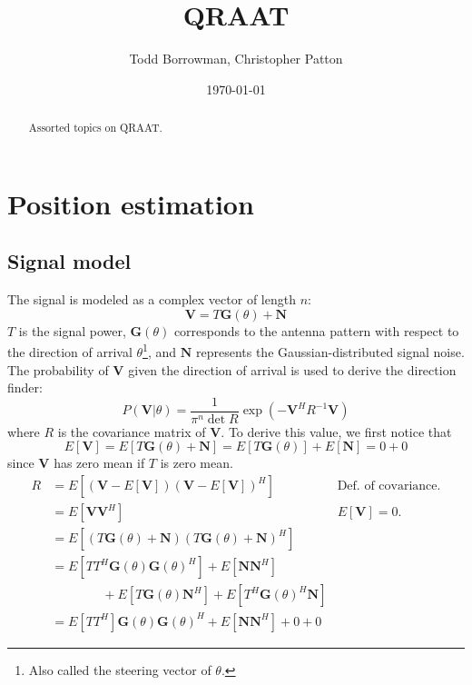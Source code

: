 \documentclass[letter]{article}
\author{Todd Borrowman, Christopher Patton}
\date{\today}
\title{QRAAT}
\newcounter{foot}
\begin{document}
\maketitle

\begin{abstract}
Assorted topics on QRAAT. 
\end{abstract}

\tableofcontents
\pagebreak



\section{Position estimation} 

  \subsection{Signal model}
The signal is modeled as a complex vector of length $n$: 
\begin{equation}
  \mathbf{V} = T\mathbf{G}(\theta) + \mathbf{N}
\end{equation}
$T$ is the signal power, $\mathbf{G}(\theta)$ corresponds to the antenna pattern 
with respect to the direction of arrival $\theta$\footnote{Also called the steering 
vector of $\theta$.}, and $\mathbf{N}$ represents 
the Gaussian-distributed signal noise. The probability of $\mathbf{V}$ given the
direction of arrival is used to derive the direction finder:
\begin{equation}
  P(\mathbf{V} | \theta) = \frac{1}{\pi^n \det{R}} \exp{(-\mathbf{V}^HR^{-1}\mathbf{V})}
\end{equation}
where $R$ is the covariance matrix of $\mathbf{V}$. To derive this value, we first 
notice that
$$ E[\mathbf{V}] = E[T\mathbf{G}(\theta) + \mathbf{N}] = E[T\mathbf{G}(\theta)] + E[\mathbf{N}] = 0 + 0 $$
since $\mathbf{V}$ has zero mean if $T$ is zero mean. 
\begin{equation*}
  \begin{aligned}
    R &= E[ (\mathbf{V} - E[\mathbf{V}])(\mathbf{V} - E[\mathbf{V}])^H ] & \text{Def. of covariance.} \\
      &= E[\mathbf{V}\mathbf{V}^H] & E[\mathbf{V}] = 0. \\ 
      &= E[(T\mathbf{G}(\theta) + \mathbf{N})(T\mathbf{G}(\theta)+ \mathbf{N})^H] \\ 
      &= E[TT^H\mathbf{G}(\theta)\mathbf{G}(\theta)^H] + E[\mathbf{N}\mathbf{N}^H] \\
       & \qquad \qquad + E[T\mathbf{G}(\theta)\mathbf{N}^H] + E[T^H\mathbf{G}(\theta)^H\mathbf{N}] \\
      &= E[TT^H]\mathbf{G}(\theta)\mathbf{G}(\theta)^H + E[\mathbf{N}\mathbf{N}^H] + 0 + 0
  \end{aligned}
\end{equation*}
\end{document}
